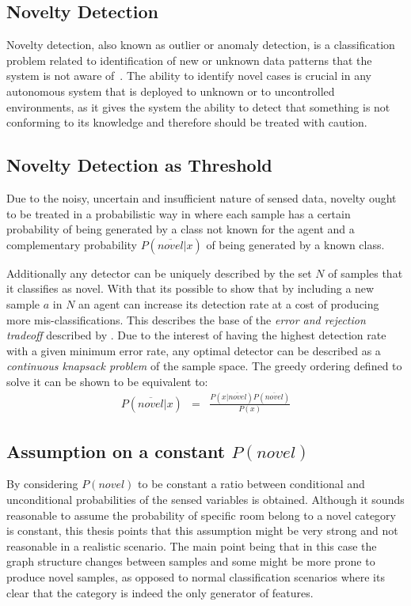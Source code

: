 \documentclass[9pt,a4paper]{extarticle}
\begin{document}
\begin{multicols}{2}
\section{Novelty Detection}
Novelty detection, also known as outlier or anomaly detection, is a
classification problem related to identification of new or unknown data
patterns that the system is not aware of~\cite{markou2003novelty}.
The ability to identify novel cases is crucial in any autonomous system
that is deployed to unknown or to uncontrolled environments, as it gives the
system the ability to detect that something is not conforming to its knowledge and
therefore should be treated with caution.

\subsection{Novelty Detection as Threshold}
Due to the noisy, uncertain and insufficient nature of sensed data, novelty ought to be
treated in a probabilistic way in where each sample has a certain probability
of being generated by a class not known for the agent and a complementary probability $P(\overline{novel}|x)$
of being generated by a known class.

Additionally any detector can be uniquely described by the set $N$ of samples that it
classifies as novel. With that its possible to show that by including a new sample $a$ in $N$ an agent
can increase its detection rate at a cost of producing more mis-classifications.
This describes the base of the \emph{error and rejection tradeoff} described by \cite{chow1970optimum}.
Due to the interest of having the highest detection rate with a given minimum error rate, any optimal
detector can be described as a \emph{continuous knapsack problem} of the sample space.
The greedy ordering defined to solve it can be shown to be equivalent to:
\begin{eqnarray}
P(\overline{novel}|x) &=& \frac{P(x|\overline{novel})P(\overline{novel})}{P(x)}
\end{eqnarray}

\subsection{Assumption on a constant $P(novel)$}
By considering $P(novel)$ to be constant a ratio between conditional and unconditional probabilities
of the sensed variables is obtained.
Although it sounds reasonable to assume the probability of specific room belong to a novel
category is constant, this thesis points that this assumption might be very strong and not
reasonable in a realistic scenario. The main point being that in this case the graph structure
changes between samples and some might be more prone to produce novel samples, as opposed to normal
classification scenarios where its clear that the category is indeed the only generator of features.


\end{multicols}
\end{document}
